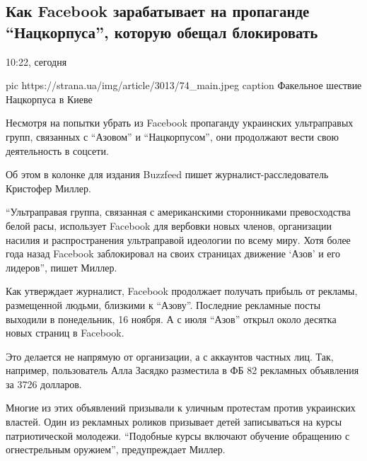 
 
 

\subsection{Как Facebook зарабатывает на пропаганде \enquote{Нацкорпуса}, которую обещал блокировать}
\label{sec:16_11_2020.news.ua.strana.2.nazkorpus_fb}

10:22, сегодня 

\ifcmt
pic https://strana.ua/img/article/3013/74_main.jpeg
caption Факельное шествие Нацкорпуса в Киеве
\fi

Несмотря на попытки убрать из Facebook пропаганду украинских ультраправых
групп, связанных с \enquote{Азовом} и \enquote{Нацкорпусом}, они продолжают вести свою
деятельность в соцсети. 

Об этом в колонке для издания Buzzfeed пишет журналист-расследователь Кристофер
Миллер. 

\enquote{Ультраправая группа, связанная с американскими сторонниками превосходства
белой расы, использует Facebook для вербовки новых членов, организации насилия
и распространения ультраправой идеологии по всему миру. Хотя более года назад
Facebook заблокировал на своих страницах движение \enquote{Азов} и его лидеров}, \dshM пишет Миллер.

Как утверждает журналист, Facebook продолжает получать прибыль от рекламы,
размещенной людьми, близкими к \enquote{Азову}. Последние рекламные посты выходили в
понедельник, 16 ноября. А с июля \enquote{Азов} открыл около десятка новых страниц в
Facebook.

Это делается не напрямую от организации, а с аккаунтов частных лиц. Так,
например, пользователь Алла Засядко разместила в ФБ 82 рекламных объявления за
3726 долларов.

Многие из этих объявлений призывали к уличным протестам против украинских
властей. Один из рекламных роликов призывает детей записываться на курсы
патриотической молодежи. \enquote{Подобные курсы включают обучение обращению с
огнестрельным оружием}, \dshM предупреждает Миллер.

